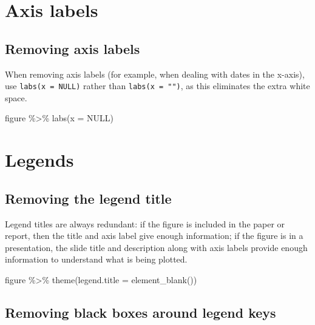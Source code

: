 \documentclass[
]{book}
\newenvironment{Shaded}{\begin{snugshade}}{\end{snugshade}}
\newcommand{\AttributeTok}[1]{\textcolor[rgb]{0.77,0.63,0.00}{#1}}
\newcommand{\ConstantTok}[1]{\textcolor[rgb]{0.00,0.00,0.00}{#1}}
\newcommand{\FunctionTok}[1]{\textcolor[rgb]{0.00,0.00,0.00}{#1}}
\newcommand{\NormalTok}[1]{#1}
\newcommand{\SpecialCharTok}[1]{\textcolor[rgb]{0.00,0.00,0.00}{#1}}
\begin{document}
\hypertarget{axis-labels}{%
\section{Axis labels}\label{axis-labels}}

\hypertarget{removing-axis-labels}{%
\subsection{Removing axis labels}\label{removing-axis-labels}}

When removing axis labels (for example, when dealing with dates in the x-axis), use \texttt{labs(x\ =\ NULL)} rather than \texttt{labs(x\ =\ "")}, as this eliminates the extra white space.

\begin{Shaded}
\begin{Highlighting}[]
\NormalTok{figure }\SpecialCharTok{\%\textgreater{}\%} 
  \FunctionTok{labs}\NormalTok{(}\AttributeTok{x =} \ConstantTok{NULL}\NormalTok{)}
\end{Highlighting}
\end{Shaded}

\hypertarget{legends}{%
\section{Legends}\label{legends}}

\hypertarget{removing-the-legend-title}{%
\subsection{Removing the legend title}\label{removing-the-legend-title}}

Legend titles are always redundant: if the figure is included in the paper or report, then the title and axis label give enough information; if the figure is in a presentation, the slide title and description along with axis labels provide enough information to understand what is being plotted.

\begin{Shaded}
\begin{Highlighting}[]
\NormalTok{figure }\SpecialCharTok{\%\textgreater{}\%} 
  \FunctionTok{theme}\NormalTok{(}\AttributeTok{legend.title =} \FunctionTok{element\_blank}\NormalTok{())}
\end{Highlighting}
\end{Shaded}

\hypertarget{removing-black-boxes-around-legend-keys}{%
\subsection{Removing black boxes around legend keys}\label{removing-black-boxes-around-legend-keys}}
\end{document}
